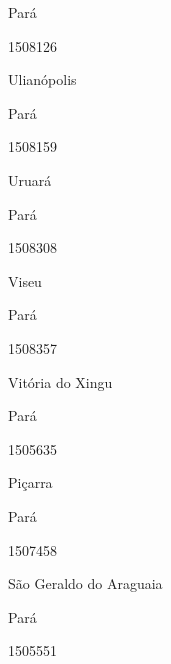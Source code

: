 \documentclass[
  letterpaper,
]{report}
\begin{document}
\n      

Pará

\n      

1508126

\n      

Ulianópolis

\n    

\n    

\n      

Pará

\n      

1508159

\n      

Uruará

\n    

\n    

\n      

Pará

\n      

1508308

\n      

Viseu

\n    

\n    

\n      

Pará

\n      

1508357

\n      

Vitória do Xingu

\n    

\n    

\n      

Pará

\n      

1505635

\n      

Piçarra

\n    

\n    

\n      

Pará

\n      

1507458

\n      

São Geraldo do Araguaia

\n    

\n    

\n      

Pará

\n      

1505551

\n      
\end{document}
